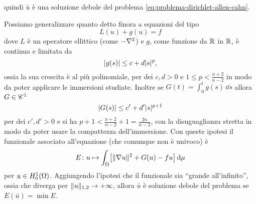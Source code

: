 quindi $\bar{u}$ è una soluzione debole del problema \eqref{eq:problema-dirichlet-allen-cahn}.

Possiamo generalizzare quanto detto finora a equazioni del tipo
\begin{equation}
    L(u)+g(u)=f
\end{equation}
dove $L$ è un operatore ellittico (come $-\lap$) e $g$, come funzione da $\R$ in $\R$, è continua e limitata da
\begin{equation}
    \abs{g(s)}\le c+d\abs{s}^p,
\end{equation}
ossia la sua crescita è al più polinomiale, per dei $c,d>0$ e $1\le p<\frac{n+2}{n-2}$ in modo da poter applicare le immersioni studiate.
Inoltre se $G(t)=\int_0^tg(s)\,\dd s$ allora $G\in\cclass[1]$
\begin{equation}
    \abs{G(s)}\le c'+d'\abs{s}^{p+1}
\end{equation}
per dei $c',d'>0$ e si ha $p+1<\frac{n+2}{n-2}+1=\frac{2n}{n-2}$, con la disuguaglianza stretta in modo da poter usare la compattezza dell'immersione.
Con queste ipotesi il funzionale associato all'equazione (che comunque non è univoco) è
\begin{equation}
    E\colon u\mapsto \int_\Omega\bigl[\norm{\grad u}^2+G(u)-fu\bigr]\,\dd\mu
\end{equation}
per $u\in\sobHc[1]{\Omega}$.
Aggiungendo l'ipotesi che il funzionale sia ``grande all'infinito'', ossia che diverga per $\norm{u}_{1,2}\to+\infty$, allora $\bar{u}$ è soluzione debole del problema se $E(\bar{u})=\min E$.
